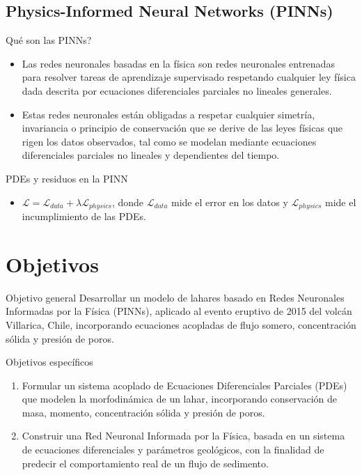 \documentclass{beamer}
\begin{document}
\subsection{Physics-Informed Neural Networks (PINNs)}
\begin{frame}{Qué son las PINNs?}
\begin{itemize}
    \item Las redes neuronales basadas en la física son redes neuronales entrenadas para resolver tareas de aprendizaje supervisado respetando
    cualquier ley física dada descrita por ecuaciones diferenciales parciales no lineales generales. \cite{RAISSI2019686}
    \item Estas redes neuronales están obligadas a respetar cualquier simetría, invariancia o principio de conservación que se derive de
    las leyes físicas que rigen los datos observados, tal como se modelan mediante ecuaciones diferenciales parciales no lineales y dependientes del tiempo.
\end{itemize}
\end{frame}

\begin{frame}{PDEs y residuos en la PINN}
\begin{itemize}
    \item $\mathcal{L} = \mathcal{L}_{data} + \lambda \mathcal{L}_{physics}$, donde $\mathcal{L}_{data}$ mide el error en los datos y $\mathcal{L}_{physics}$ mide el incumplimiento de las PDEs.
\end{itemize}
\end{frame}


\section{Objetivos}
\begin{frame}
    
    \begin{block}{Objetivo general}
        Desarrollar un modelo de lahares basado en Redes Neuronales Informadas por la Física (PINNs), aplicado al evento eruptivo de 2015 del volcán Villarica, Chile, incorporando ecuaciones acopladas de flujo somero, concentración sólida y presión de poros.
    \end{block}
    
    \begin{block}{Objetivos específicos}
        \begin{enumerate}
            \item Formular un sistema acoplado de Ecuaciones Diferenciales Parciales (PDEs) que modelen la morfodinámica de un lahar, incorporando conservación de masa, momento, concentración sólida y presión de poros.
            \item Construir una Red Neuronal Informada por la Física, basada en un sistema de ecuaciones diferenciales y parámetros geológicos, con la finalidad de predecir el comportamiento real de un flujo de sedimento. 
        \end{enumerate}
    \end{block}
\end{frame}
\end{document}
